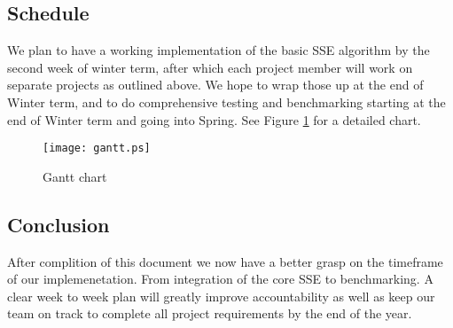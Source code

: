 



\subsection {Schedule}

We plan to have a working implementation of the basic SSE algorithm by the second week of winter term, after which each project member will work on separate projects as outlined above.
We hope to wrap those up at the end of Winter term, and to do comprehensive testing and benchmarking starting at the end of Winter term and going into Spring.
See Figure \ref{figure:gantt} for a detailed chart.

\begin{figure}
\centering
\texttt{[image: gantt.ps]}
\caption{Gantt chart}
\label{figure:gantt}
\end{figure}



    
    
    


\subsection{ Conclusion }
After complition of this document we now have a better grasp on the timeframe of our implemenetation. From integration of the core SSE to benchmarking. A clear week to week plan will greatly improve accountability as well as keep our team on track to complete all project requirements by the end of the year. 

{}